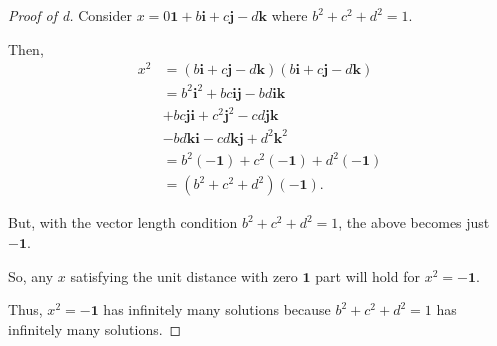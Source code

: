 \documentclass[../hw3]{subfiles}
\begin{document}
\begin{proof}[Proof of d]
	Consider $x=0\mathbf{1} + b\mathbf{i}+c\mathbf{j}-d\mathbf{k}$ where $b^2 + c^2 + d^2=1$.

	Then,
	\begin{align*}
		x^2 & = (b\mathbf{i} + c\mathbf{j}-d\mathbf{k})(b\mathbf{i} + c\mathbf{j}-d\mathbf{k}) \\
		    & = b^2\mathbf{i}^2 + bc\mathbf{i}\mathbf{j}-bd\mathbf{i}\mathbf{k}                \\
		    & + bc\mathbf{j}\mathbf{i} +c^2\mathbf{j}^2-cd\mathbf{j}\mathbf{k}                 \\
		    & - bd\mathbf{k}\mathbf{i}-cd\mathbf{k}\mathbf{j}+d^2\mathbf{k}^2                  \\
		    & = b^2(-\mathbf{1}) + c^2(-\mathbf{1}) + d^2(-\mathbf{1})                         \\
		    & = (b^2 + c^2 +d^2)(-\mathbf{1})
		.\end{align*}

	But, with the vector length condition $b^2 + c^2 + d^2=1$, the above becomes just $-\mathbf{1}$.

	So, any $x$ satisfying the unit distance with zero $\mathbf{1}$ part will hold for $x^2=-\mathbf{1}$.

	Thus, $x^2=-\mathbf{1}$ has infinitely many solutions because $b^2 + c^2 + d^2=1$ has infinitely many solutions.
\end{proof}
\end{document}
